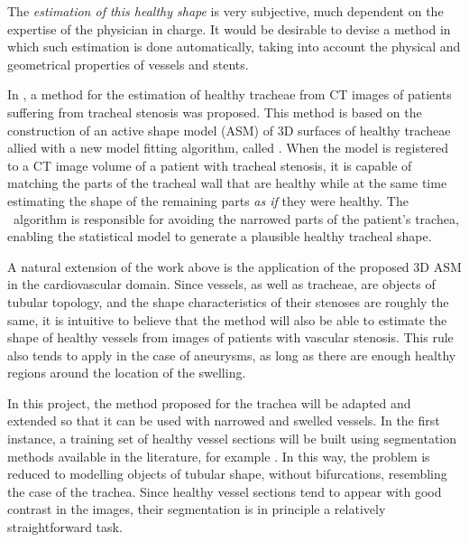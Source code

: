 The {\em estimation of this healthy shape} is very subjective, much dependent on the expertise of the physician in charge. It would be desirable to devise a method in which such estimation is done automatically, taking into account the physical and geometrical properties of vessels and stents.

\approach
In \citep{Pinho:Trachea4,Pinho:Thesis}, a method for the estimation of healthy tracheae from CT images of patients suffering from tracheal stenosis was proposed. This method is based on the construction of an active shape model (ASM) \citep{Cootes} of 3D surfaces of healthy tracheae allied with a new model fitting algorithm, called \fixedland. When the model is registered to a CT image volume of a patient with tracheal stenosis, it is capable of matching the parts of the tracheal wall that are healthy while at the same time estimating the shape of the remaining parts {\em as if} they were healthy. The \fixedland\ algorithm is responsible for avoiding the narrowed parts of the patient's trachea, enabling the statistical model to generate a plausible healthy tracheal shape.

A natural extension of the work above is the application of the proposed 3D ASM in the cardiovascular domain. Since vessels, as well as tracheae, are objects of tubular topology, and the shape characteristics of their stenoses are roughly the same, it is intuitive to believe that the method will also be able to estimate the shape of healthy vessels from images of patients with vascular stenosis. This rule also tends to apply in the case of aneurysms, as long as there are enough healthy regions around the location of the swelling.

In this project, the method proposed for the trachea will be adapted and extended so that it can be used with narrowed and swelled vessels. In the first instance, a training set of healthy vessel sections will be built using segmentation methods available in the literature, for example \citep{Florez2}. In this way, the problem is reduced to modelling objects of tubular shape, without bifurcations, resembling the case of the trachea. Since healthy vessel sections tend to appear with good contrast in the images, their segmentation is in principle a relatively straightforward task. 

